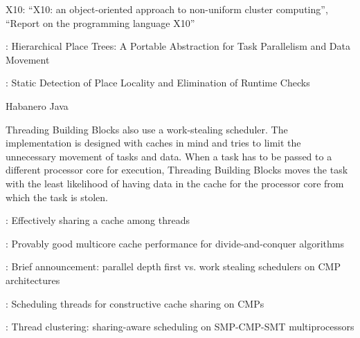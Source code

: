 
X10: \textcite{Charles2005} ``X10: an object-oriented approach to
non-uniform cluster computing'', \textcite{Saraswat2010} ``Report on
the programming language X10''

\textcite{Yan2009}: Hierarchical Place Trees: A Portable Abstraction
for Task Parallelism and Data Movement

\textcite{Agarwal2008}: Static Detection of Place Locality and
Elimination of Runtime Checks

Habanero Java

Threading Building Blocks \cite{Contreras2008, Reinders2007} also use
a work-stealing scheduler. The implementation is designed with caches
in mind and tries to limit the unnecessary movement of tasks and
data. When a task has to be passed to a different processor core for
execution, Threading Building Blocks moves the task with the least
likelihood of having data in the cache for the processor core from
which the task is stolen.


\textcite{Blelloch2004}: Effectively sharing a cache among threads

\textcite{Blelloch2008}: Provably good multicore cache performance for
divide-and-conquer algorithms

\textcite{Liaskovitis2006}: Brief announcement: parallel depth first
vs. work stealing schedulers on CMP architectures

\textcite{Chen2007}: Scheduling threads for constructive cache sharing
on CMPs

\textcite{Tam2007}: Thread clustering: sharing-aware scheduling on
SMP-CMP-SMT multiprocessors



